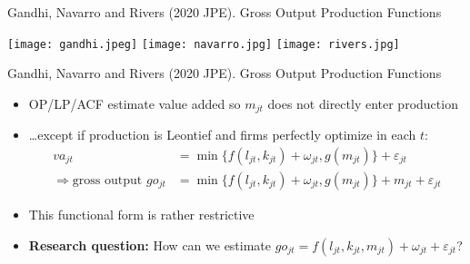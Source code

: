 \documentclass[aspectratio=169,compress,t,xcolor=table]{beamer}
\begin{document}
\begin{frame}{}
Gandhi, Navarro and Rivers (2020 JPE). Gross Output Production Functions \\ \phantom{you}
  \begin{center}
    \texttt{[image: gandhi.jpeg]} \hspace*{1em}
    \texttt{[image: navarro.jpg]} \hspace*{1em}
    \texttt{[image: rivers.jpg]}
  \end{center}
\end{frame}
\addtocounter{framenumber}{-1}

\begin{frame}{}
Gandhi, Navarro and Rivers (2020 JPE). Gross Output Production Functions 
  \begin{itemize}
    \vfill\item OP/LP/ACF estimate value added so \(m_{jt}\) does not directly enter production
    \vfill\item \ldots except if production is Leontief and firms perfectly optimize in each \(t\):
    \begin{align*}
      va_{jt} &= \min \lbrace f(l_{jt}, k_{jt}) + \omega_{jt}, g(m_{jt}) \rbrace + \varepsilon_{jt} \\
      \Rightarrow\text{gross output } go_{jt} &= \min \lbrace f(l_{jt}, k_{jt}) + \omega_{jt}, g(m_{jt}) \rbrace + m_{jt} + \varepsilon_{jt}
    \end{align*}
    \vfill\item This functional form is rather restrictive
    \vfill\item {\color{MyStructure}\textbf{Research question:}} How can we estimate \(go_{jt} = f(l_{jt}, k_{jt}, m_{jt}) + \omega_{jt} + \varepsilon_{jt}\)?
  \end{itemize}
\end{frame}
\end{document}
